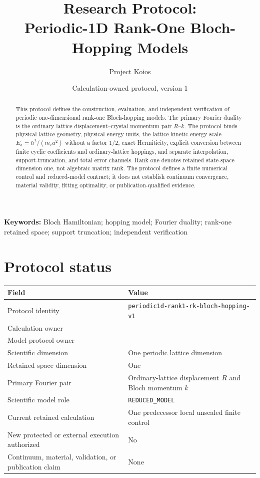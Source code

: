 \documentclass[11pt]{article}
\title{Research Protocol:\\Periodic-1D Rank-One Bloch-Hopping Models}
\author{Project Koios}
\date{Calculation-owned protocol, version 1}
\newcommand{\Ea}{E_{a}}
\begin{document}
\maketitle

\begin{abstract}
This protocol defines the construction, evaluation, and independent verification of
periodic one-dimensional rank-one Bloch-hopping models.  The primary Fourier duality is
the ordinary-lattice displacement--crystal-momentum pair $R$--$k$.  The protocol binds
physical lattice geometry, physical energy units, the lattice kinetic-energy scale
$\Ea=\hbar^2/(m_ea^2)$ without a factor $1/2$, exact Hermiticity, explicit conversion
between finite cyclic coefficients and ordinary-lattice hoppings, and separate
interpolation, support-truncation, and total error channels.  Rank one denotes retained
state-space dimension one, not algebraic matrix rank.  The protocol defines a finite
numerical control and reduced-model contract; it does not establish continuum
convergence, material validity, fitting optimality, or publication-qualified evidence.
\end{abstract}

\noindent\textbf{Keywords:} Bloch Hamiltonian; hopping model; Fourier duality;
rank-one retained space; support truncation; independent verification

\tableofcontents
\clearpage

\section{Protocol status}

\begin{center}
\small
\begin{tabularx}{\textwidth}{L{0.34\textwidth}Y}
\toprule
\textbf{Field} & \textbf{Value} \\
\midrule
Protocol identity & \texttt{periodic1d-rank1-rk-bloch-hopping-v1} \\
Calculation owner &  \\
Model protocol owner &  \\
Scientific dimension & One periodic lattice dimension \\
Retained-space dimension & One \\
Primary Fourier pair & Ordinary-lattice displacement $R$ and Bloch momentum $k$ \\
Scientific model role & \texttt{REDUCED\_MODEL} \\
Current retained calculation & One predecessor local unsealed finite control \\
New protected or external execution authorized & No \\
Continuum, material, validation, or publication claim & None \\
\bottomrule
\end{tabularx}
\end{center}
\end{document}
